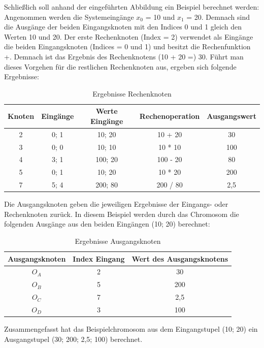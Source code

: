 Schließlich soll anhand der eingeführten Abbildung ein Beispiel berechnet werden:\newline
Angenommen werden die Systemeingänge $x_0$ = 10 und $x_1$ = 20.
Demnach sind die Ausgänge der beiden Eingangsknoten mit den Indices 0 und 1 gleich den Werten 10 und 20.
Der erste Rechenknoten (Index = 2) verwendet als Eingänge die beiden Eingangsknoten (Indices = 0 und 1) und besitzt die Rechenfunktion +.
Demnach ist das Ergebnis des Rechenknotens (10 + 20 =) 30.
Führt man dieses Vorgehen für die restlichen Rechenknoten aus, ergeben sich folgende Ergebnisse:

\begin{table}[h]
    \centering
    \begin{tabular}{c|c|c|c|c}
       \textbf{Knoten} & \textbf{Eingänge} & \textbf{Werte Eingänge} & \textbf{Rechenoperation} & \textbf{Ausgangswert} \\ \hline
        2 & 0; 1 & 10; 20 & 10 + 20 & 30 \\ \hline
        3 & 0; 0 & 10; 10 & 10 * 10 & 100 \\ \hline
        4 & 3; 1 & 100; 20 & 100 - 20 & 80 \\ \hline
        5 & 0; 1 & 10; 20 & 10 * 20 & 200 \\ \hline
        7 & 5; 4 & 200; 80 & 200 / 80 & 2,5
    \end{tabular}
    \caption{Ergebnisse Rechenknoten}
    \label{table:ergebnisseRechenknoten}
\end{table}

Die Ausgangsknoten geben die jeweiligen Ergebnisse der Eingangs- oder Rechenknoten zurück.
In diesem Beispiel werden durch das Chromosom die folgenden Ausgänge aus den beiden Eingängen (10; 20) berechnet:

\begin{table}[h]
    \centering
    \begin{tabular}{c|c|c}
       \textbf{Ausgangsknoten} & \textbf{Index Eingang} & \textbf{Wert des Ausgangsknotens} \\ \hline
        $O_A$ & 2 & 30 \\ \hline
        $O_B$ & 5 & 200 \\ \hline
        $O_C$ & 7 & 2,5 \\ \hline
        $O_D$ & 3 & 100
    \end{tabular}
    \caption{Ergebnisse Ausgangsknoten}
    \label{table:ergebnisseAusgangsknoten}
\end{table}

Zusammengefasst hat das Beispielchromosom aus dem Eingangstupel (10; 20) ein Ausgangstupel (30; 200; 2,5; 100) berechnet.\\

